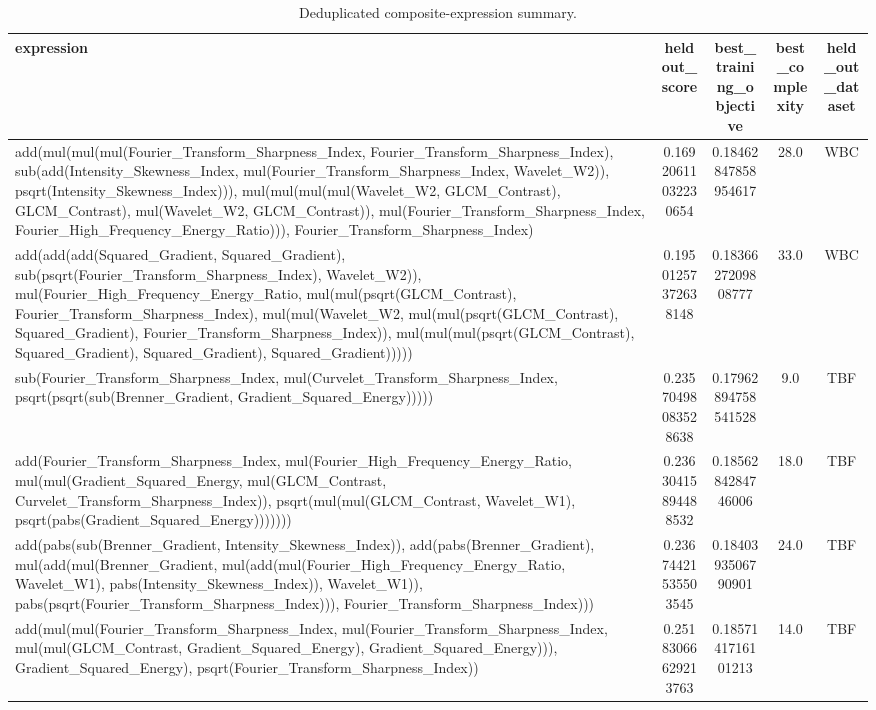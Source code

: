 \begin{table}[t]
\centering
\caption{Deduplicated composite-expression summary.}
\begin{tabular}{lcccc}
\hline
expression & heldout_score & best_training_objective & best_complexity & held_out_dataset \\
\hline
add(mul(mul(mul(Fourier\_Transform\_Sharpness\_Index, Fourier\_Transform\_Sharpness\_Index), sub(add(Intensity\_Skewness\_Index, mul(Fourier\_Transform\_Sharpness\_Index, Wavelet\_W2)), psqrt(Intensity\_Skewness\_Index))), mul(mul(mul(mul(Wavelet\_W2, GLCM\_Contrast), GLCM\_Contrast), mul(Wavelet\_W2, GLCM\_Contrast)), mul(Fourier\_Transform\_Sharpness\_Index, Fourier\_High\_Frequency\_Energy\_Ratio))), Fourier\_Transform\_Sharpness\_Index) & 0.16920611032230654 & 0.18462847858954617 & 28.0 & WBC \\
add(add(add(Squared\_Gradient, Squared\_Gradient), sub(psqrt(Fourier\_Transform\_Sharpness\_Index), Wavelet\_W2)), mul(Fourier\_High\_Frequency\_Energy\_Ratio, mul(mul(psqrt(GLCM\_Contrast), Fourier\_Transform\_Sharpness\_Index), mul(mul(Wavelet\_W2, mul(mul(psqrt(GLCM\_Contrast), Squared\_Gradient), Fourier\_Transform\_Sharpness\_Index)), mul(mul(mul(psqrt(GLCM\_Contrast), Squared\_Gradient), Squared\_Gradient), Squared\_Gradient))))) & 0.19501257372638148 & 0.1836627209808777 & 33.0 & WBC \\
sub(Fourier\_Transform\_Sharpness\_Index, mul(Curvelet\_Transform\_Sharpness\_Index, psqrt(psqrt(sub(Brenner\_Gradient, Gradient\_Squared\_Energy))))) & 0.23570498083528638 & 0.17962894758541528 & 9.0 & TBF \\
add(Fourier\_Transform\_Sharpness\_Index, mul(Fourier\_High\_Frequency\_Energy\_Ratio, mul(mul(Gradient\_Squared\_Energy, mul(GLCM\_Contrast, Curvelet\_Transform\_Sharpness\_Index)), psqrt(mul(mul(GLCM\_Contrast, Wavelet\_W1), psqrt(pabs(Gradient\_Squared\_Energy))))))) & 0.23630415894488532 & 0.1856284284746006 & 18.0 & TBF \\
add(pabs(sub(Brenner\_Gradient, Intensity\_Skewness\_Index)), add(pabs(Brenner\_Gradient), mul(add(mul(Brenner\_Gradient, mul(add(mul(Fourier\_High\_Frequency\_Energy\_Ratio, Wavelet\_W1), pabs(Intensity\_Skewness\_Index)), Wavelet\_W1)), pabs(psqrt(Fourier\_Transform\_Sharpness\_Index))), Fourier\_Transform\_Sharpness\_Index))) & 0.23674421535503545 & 0.1840393506790901 & 24.0 & TBF \\
add(mul(mul(Fourier\_Transform\_Sharpness\_Index, mul(Fourier\_Transform\_Sharpness\_Index, mul(mul(GLCM\_Contrast, Gradient\_Squared\_Energy), Gradient\_Squared\_Energy))), Gradient\_Squared\_Energy), psqrt(Fourier\_Transform\_Sharpness\_Index)) & 0.25183066629213763 & 0.1857141716101213 & 14.0 & TBF \\

\end{tabular}
\end{table}
